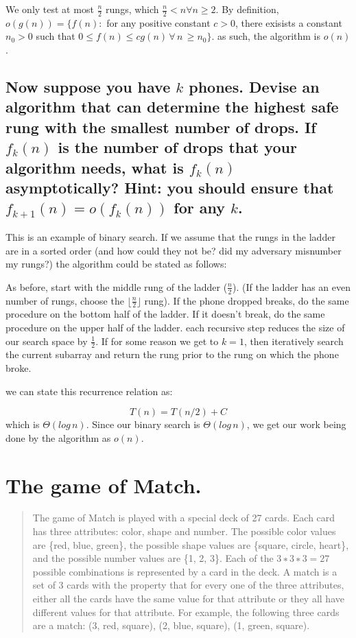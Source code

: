\documentclass[titlepage]{article}\usepackage[]{graphicx}\usepackage[]{color}
\begin{document}
  We only test at most $\frac{n}{2}$ rungs, which $\frac{n}{2} < n
  \forall n \geq 2$. 
  By definition, $o(g(n)) = \{ f(n) : $ for any positive constant $c>0$, there
  exisists a constant $n_0 > 0$ such that $0 \leq f(n) \leq cg(n) \, \forall \,
  n \, \geq n_0\}$.
  as such, the algorithm is $o(n)$. 

\subsection{Now suppose you have $k$ phones. Devise an algorithm that can
  determine the highest safe rung with the smallest number of drops. If
  $f_k(n)$
  is the number of drops that your algorithm needs, what is 
  $f_k(n)$ asymptotically? Hint: you should ensure that 
  $f_{k+1}(n) = o(f_k(n))$ for any $k$.}

  This is an example of binary search. If we assume that the rungs in the
  ladder are in a sorted order (and how could they not be? did my adversary
  misnumber my rungs?)  the algorithm could
  be stated as follows:

  As before, start with the middle rung of the ladder ($\frac{n}{2}$). (If the
  ladder has an even number of rungs, choose the $\lfloor
  \frac{n}{2} \rfloor$ rung). If the
  phone dropped breaks, do the same procedure on the bottom half of the ladder.
  If it doesn't break, do the same procedure on the upper half of the ladder.
  each recursive step reduces the size of our search space by $\frac{1}{2}$. If
  for some reason we get to $k=1$, then iteratively search the current subarray
  and return the rung prior to the rung on which the phone broke.

  we can state this recurrence relation as:

  \[ T(n) = T(n/2) + C \]
  which is $\Theta(log\,n)$. Since our binary search is $\Theta(log\,n)$, we
  get our work being done by the algorithm as $o(n)$. 
  

  \section{ The game of Match. }
  \begin{quote}
  The game of Match is played with a special deck of 27 cards. Each card has
  three attributes: color, shape and number. The possible color values are
  \{red, blue, green\}, the possible shape values are \{square, circle, heart\},
  and the possible number values are \{1, 2, 3\}. Each of the $3 ∗ 3 ∗ 3 = 27$
  possible combinations is represented by a card in the deck. A match is a set
  of 3 cards with the property that for every one of the three attributes,
  either all the cards have the same value for that attribute or they all have
  different values for that attribute. For example, the following three cards
  are a match: (3, red, square), (2, blue, square), (1, green, square).
  \end{quote}
\end{document}
